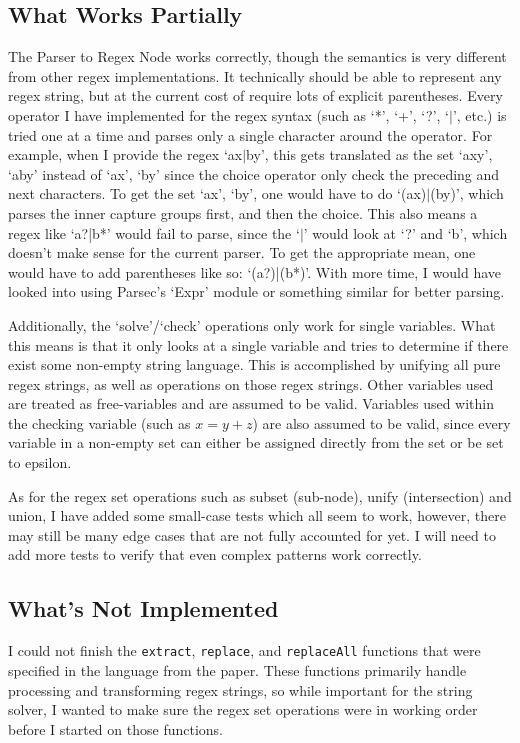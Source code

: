 \documentclass[letterpaper, 11pt]{article}
\begin{document}
\subsection{What Works Partially}\label{sec:partially}
The Parser to Regex Node works correctly, though the semantics is very different from other regex implementations.
It technically should be able to represent any regex string, but at the current cost of require lots of explicit parentheses.
Every operator I have implemented for the regex syntax (such as `*', `+', `?', `$|$', etc.) is tried one at a time and parses only a single character around the operator.
For example, when I provide the regex `ax$|$by', this gets translated as the set {`axy', `aby'} instead of {`ax', `by'} since the choice operator only check the preceding and next characters.
To get the set {`ax', `by'}, one would have to do `(ax)$|$(by)', which parses the inner capture groups first, and then the choice.
This also means a regex like `a?|b*' would fail to parse, since the `$|$' would look at `?' and `b', which doesn't make sense for the current parser.
To get the appropriate mean, one would have to add parentheses like so: `(a?)|(b*)'.
With more time, I would have looked into using Parsec's `Expr' module or something similar for better parsing.

Additionally, the `solve'/`check' operations only work for single variables.
What this means is that it only looks at a single variable and tries to determine if there exist some non-empty string language.
This is accomplished by unifying all pure regex strings, as well as operations on those regex strings.
Other variables used are treated as free-variables and are assumed to be valid.
Variables used within the checking variable (such as $x = y + z$) are also assumed to be valid, since every variable in a non-empty set can either be assigned directly from the set or be set to epsilon.

As for the regex set operations such as subset (sub-node), unify (intersection) and union, I have added some small-case tests which all seem to work, however, there may still be many edge cases that are not fully accounted for yet.
I will need to add more tests to verify that even complex patterns work correctly.

\subsection{What's Not Implemented}\label{sec:not_impl}

I could not finish the \lstinline{extract}, \lstinline{replace}, and \lstinline{replaceAll} functions that were specified in the language from the paper. 
These functions primarily handle processing and transforming regex strings, so while important for the string solver, I wanted to make sure the regex set operations were in working order before I started on those functions.
\end{document}
